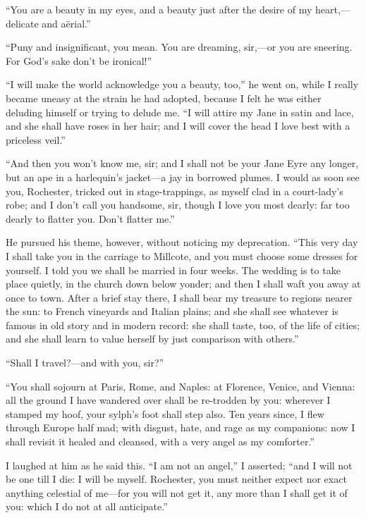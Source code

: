 \enquote{You are a beauty in my eyes, and a beauty just after the desire
of my heart,---delicate and aërial.}

\enquote{Puny and insignificant, you mean.  You are dreaming, sir,---or
you are sneering.  For God's sake don't be ironical!}

\enquote{I will make the world acknowledge you a beauty, too,} he went
on, while I really became uneasy at the strain he had adopted, because I
felt he was either deluding himself or trying to delude me.  \enquote{I
will attire my Jane in satin and lace, and she shall have roses in her
hair; and I will cover the head I love best with a priceless veil.}

\enquote{And then you won't know me, sir; and I shall not be your Jane
Eyre any longer, but an ape in a harlequin's jacket---a jay in borrowed
plumes.  I would as soon see you, \Mr{} Rochester, tricked out in
stage-trappings, as myself clad in a court-lady's robe; and I don't call
you handsome, sir, though I love you most dearly: far too dearly to
flatter you.  Don't flatter me.}

He pursued his theme, however, without noticing my deprecation. 
\enquote{This very day I shall take you in the carriage to Millcote, and
you must choose some dresses for yourself.  I told you we shall be
married in four weeks.  The wedding is to take place quietly, in the
church down below yonder; and then I shall waft you away at once to
town.  After a brief stay there, I shall bear my treasure to regions
nearer the sun: to French vineyards and Italian plains; and she shall
see whatever is famous in old story and in modern record: she shall
taste, too, of the life of cities; and she shall learn to value herself
by just comparison with others.}

\enquote{Shall I travel?---and with you, sir?}

\enquote{You shall sojourn at Paris, Rome, and Naples: at Florence,
Venice, and Vienna: all the ground I have wandered over shall be
re-trodden by you: wherever I stamped my hoof, your sylph's foot shall
step also.  Ten years since, I flew through Europe half mad; with
disgust, hate, and rage as my companions: now I shall revisit it healed
and cleansed, with a very angel as my comforter.}

I laughed at him as he said this.  \enquote{I am not an angel,} I
asserted; \enquote{and I will not be one till I die: I will be myself. 
\Mr{} Rochester, you must neither expect nor exact anything celestial of
me---for you will not get it, any more than I shall get it of you: which
I do not at all anticipate.}

